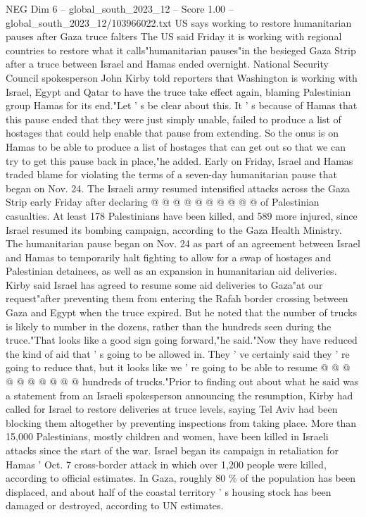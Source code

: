 \begin{textsample}{NEG Dim 6 – global\_south\_2023\_12 – Score 1.00 – global\_south\_2023\_12/103966022.txt}  \label{ex:f6_neg_320}
US says working to restore humanitarian pauses after Gaza truce falters The US said Friday it is working with regional countries to restore what it calls"humanitarian pauses"in the besieged Gaza Strip after a truce between Israel and Hamas ended overnight.
National Security Council spokesperson John Kirby told reporters that Washington is working with Israel, Egypt and Qatar to have the truce take effect again, blaming Palestinian group Hamas for its end."Let ' s be clear about this.
It ' s because of Hamas that this pause ended that they were just simply unable, failed to produce a list of hostages that could help enable that pause from extending.
So the onus is on Hamas to be able to produce a list of hostages that can get out so that we can try to get this pause back in place,"he added.
Early on Friday, Israel and Hamas traded blame for violating the terms of a seven-day humanitarian pause that began on Nov. 24.
The Israeli army resumed intensified attacks across the Gaza Strip early Friday after declaring @ @ @ @ @ @ @ @ @ @ of Palestinian casualties.
At least 178 Palestinians have been killed, and 589 more injured, since Israel resumed its bombing campaign, according to the Gaza Health Ministry.
The humanitarian pause began on Nov. 24 as part of an agreement between Israel and Hamas to temporarily halt fighting to allow for a swap of hostages and Palestinian detainees, as well as an expansion in humanitarian aid deliveries.
Kirby said Israel has agreed to resume some aid deliveries to Gaza"at our request"after preventing them from entering the Rafah border crossing between Gaza and Egypt when the truce expired.
But he noted that the number of trucks is likely to number in the dozens, rather than the hundreds seen during the truce."That looks like a good sign going forward,"he said."Now they have reduced the kind of aid that ' s going to be allowed in.
They ' ve certainly said they ' re going to reduce that, but it looks like we ' re going to be able to resume @ @ @ @ @ @ @ @ @ @ hundreds of trucks."Prior to finding out about what he said was a statement from an Israeli spokesperson announcing the resumption, Kirby had called for Israel to restore deliveries at truce levels, saying Tel Aviv had been blocking them altogether by preventing inspections from taking place.
More than 15,000 Palestinians, mostly children and women, have been killed in Israeli attacks since the start of the war.
Israel began its campaign in retaliation for Hamas ' Oct. 7 cross-border attack in which over 1,200 people were killed, according to official estimates.
In Gaza, roughly 80 \% of the population has been displaced, and about half of the coastal territory ' s housing stock has been damaged or destroyed, according to UN estimates.

\end{textsample}
